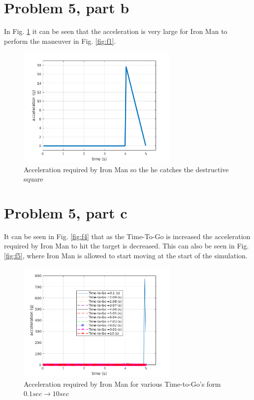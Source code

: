 \documentclass[paper=a4, fontsize=11pt]{scrartcl}
\numberwithin{equation}{section}		%
\numberwithin{figure}{section}			%
\numberwithin{table}{section}				%
\begin{document}
\section*{Problem 5, part b}
In Fig. \ref{fig:f2} it can be seen that the acceleration is very large for Iron Man to perform the maneuver in Fig. \ref{fig:f1}.
\begin{figure}[!htb]
	\centering
	\includegraphics[width=0.7\textwidth]{fiveb}
	\caption{ Acceleration required by Iron Man so the he catches the destructive square\label{fig:f2}}
\end{figure}

\section*{Problem 5, part c}
It can be seen in Fig. \ref{fig:f4} that as the Time-To-Go is increased the acceleration required by Iron Man to hit the target is decreased. This can also be seen in Fig. \ref{fig:f5}, where Iron Man is allowed to start moving at the start of the simulation.
\begin{figure}[!htb]
	\centering
	\includegraphics[width=0.7\textwidth]{fivec1}
	\caption{ Acceleration required by Iron Man for various Time-to-Go's form $0.1sec \rightarrow 10sec$\label{fig:f3}}
\end{figure}
\end{document}
